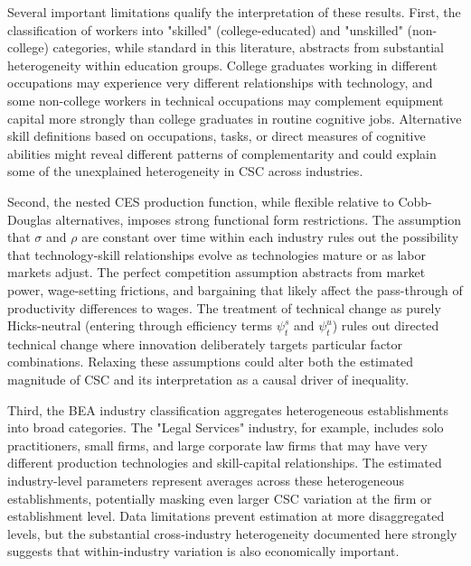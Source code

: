 \documentclass[12pt]{article}
\begin{document}
Several important limitations qualify the interpretation of these results. First, the classification of workers into "skilled" (college-educated) and "unskilled" (non-college) categories, while standard in this literature, abstracts from substantial heterogeneity within education groups. College graduates working in different occupations may experience very different relationships with technology, and some non-college workers in technical occupations may complement equipment capital more strongly than college graduates in routine cognitive jobs. Alternative skill definitions based on occupations, tasks, or direct measures of cognitive abilities might reveal different patterns of complementarity and could explain some of the unexplained heterogeneity in CSC across industries.

Second, the nested CES production function, while flexible relative to Cobb-Douglas alternatives, imposes strong functional form restrictions. The assumption that $\sigma$ and $\rho$ are constant over time within each industry rules out the possibility that technology-skill relationships evolve as technologies mature or as labor markets adjust. The perfect competition assumption abstracts from market power, wage-setting frictions, and bargaining that likely affect the pass-through of productivity differences to wages. The treatment of technical change as purely Hicks-neutral (entering through efficiency terms $\psi^s_t$ and $\psi^u_t$) rules out directed technical change where innovation deliberately targets particular factor combinations. Relaxing these assumptions could alter both the estimated magnitude of CSC and its interpretation as a causal driver of inequality.

Third, the BEA industry classification aggregates heterogeneous establishments into broad categories. The "Legal Services" industry, for example, includes solo practitioners, small firms, and large corporate law firms that may have very different production technologies and skill-capital relationships. The estimated industry-level parameters represent averages across these heterogeneous establishments, potentially masking even larger CSC variation at the firm or establishment level. Data limitations prevent estimation at more disaggregated levels, but the substantial cross-industry heterogeneity documented here strongly suggests that within-industry variation is also economically important.
\end{document}
